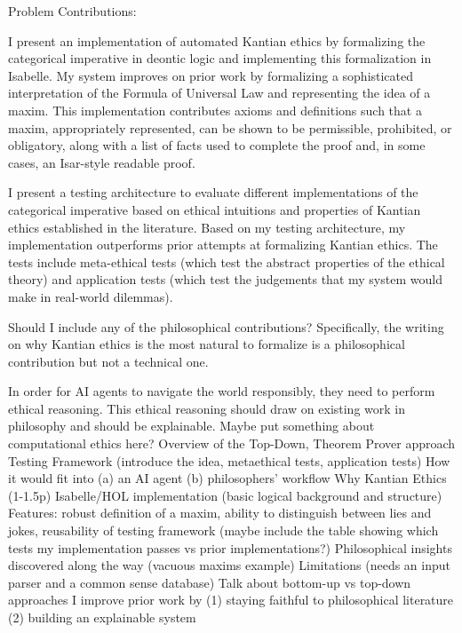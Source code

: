 \documentclass[11pt]{article}
\begin{document}
\begin{outline}[enumerate]
\1[Introduction (1p)] 
\2 Problem
\2 Contributions:

\3 I present an implementation of automated Kantian ethics by formalizing the categorical
imperative in deontic logic and implementing this formalization in Isabelle. My system
improves on prior work by formalizing a sophisticated interpretation of the Formula of Universal Law 
and representing the idea of a maxim. This implementation contributes axioms and definitions such that 
a maxim, appropriately represented,
can be shown to be permissible, prohibited, or obligatory, along with a list of facts used
to complete the proof and, in some cases, an Isar-style readable proof.

\3 I present a testing architecture to evaluate different implementations of the categorical imperative
based on ethical intuitions and properties of Kantian ethics established in the literature. Based on 
my testing architecture, my implementation outperforms prior attempts at formalizing Kantian ethics.
The tests include meta-ethical tests (which test the abstract properties of the ethical theory)
and application tests (which test the judgements that my system would make in real-world dilemmas).

\3 Should I include any of the philosophical contributions? Specifically, the writing on why Kantian 
ethics is the most natural to formalize is a philosophical contribution but not a technical one. 

\2 In order for AI agents to navigate the world responsibly, they need to perform ethical reasoning.
\2 This ethical reasoning should draw on existing work in philosophy and should be explainable.
\2 Maybe put something about computational ethics here?
\1[My Idea (2p)]
\2 Overview of the Top-Down, Theorem Prover approach
\2 Testing Framework (introduce the idea, metaethical tests, application tests)
\2 How it would fit into (a) an AI agent (b) philosophers' workflow
\2 Why Kantian Ethics (1-1.5p)
\2 Isabelle/HOL implementation (basic logical background and structure)
\2 Features: robust definition of a maxim, ability to distinguish between lies and jokes, reusability of 
testing framework (maybe include the table showing which tests my implementation passes vs prior implementations?)
\2 Philosophical insights discovered along the way (vacuous maxims example)
\2 Limitations (needs an input parser and a common sense database)
\2 Talk about bottom-up vs top-down approaches 
\2 I improve prior work by (1) staying faithful to philosophical literature (2) building an explainable
system
\1[Conclusion (0.5p)]



\end{outline}
\end{document}
